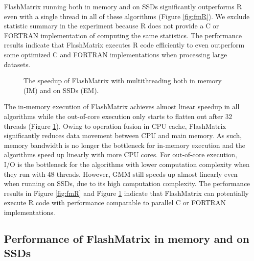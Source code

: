 FlashMatrix running both in memory and on SSDs significantly outperforms R
even with a single thread in all of these algorithms (Figure \ref{fig:fmR}).
We exclude statistic summary in the experiment because R does not provide
a C or FORTRAN implementation of computing the same statistics. The performance
results indicate that FlashMatrix executes R code efficiently to even outperform
some optimized C and FORTRAN implementations when processing large datasets.

\begin{figure}
	\begin{center}
		\footnotesize
		\vspace{-15pt}
		
		\vspace{-10pt}
		\caption{The speedup of FlashMatrix with multithreading both in memory (IM)
		and on SSDs (EM).}
		\label{fig:speedup}
	\end{center}
\end{figure}

The in-memory execution of FlashMatrix achieves almost linear speedup in all
algorithms while the out-of-core execution only
starts to flatten out after 32 threads (Figure \ref{fig:speedup}). Owing to
operation fusion in CPU cache, FlashMatrix significantly reduces data movement
between CPU and main memory. As such, memory bandwidth is no longer the bottleneck
for in-memory execution and the algorithms speed up linearly with more CPU cores.
For out-of-core execution, I/O is the bottleneck for the algorithms with
lower computation complexity when they run with 48 threads. However,
GMM still speeds up almost linearly even when running on SSDs, due to its high
computation complexity. The performance results in Figure \ref{fig:fmR} and Figure
\ref{fig:speedup} indicate that FlashMatrix can potentially execute R code with
performance comparable to parallel C or FORTRAN implementations.

%		

\subsection{Performance of FlashMatrix in memory and on SSDs}

